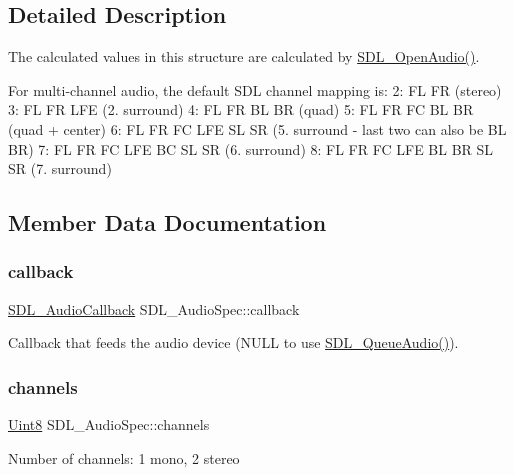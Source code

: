 \subsection{Detailed Description}
The calculated values in this structure are calculated by \mbox{\hyperlink{_s_d_l__audio_8h_a2edf30e7747584e28041b4986f89f440}{S\+D\+L\+\_\+\+Open\+Audio()}}.

For multi-\/channel audio, the default S\+DL channel mapping is\+: 2\+: FL FR (stereo) 3\+: FL FR L\+FE (2. surround) 4\+: FL FR BL BR (quad) 5\+: FL FR FC BL BR (quad + center) 6\+: FL FR FC L\+FE SL SR (5. surround -\/ last two can also be BL BR) 7\+: FL FR FC L\+FE BC SL SR (6. surround) 8\+: FL FR FC L\+FE BL BR SL SR (7. surround) 

\subsection{Member Data Documentation}
\mbox{\label{struct_s_d_l___audio_spec_a1f8d05139f1679dcf359f49251233eac}} 
\subsubsection{\texorpdfstring{callback}{callback}}
{\footnotesize\ttfamily \mbox{\hyperlink{_s_d_l__audio_8h_a379fcc25845e46bfa80cb3619fc2821c}{S\+D\+L\+\_\+\+Audio\+Callback}} S\+D\+L\+\_\+\+Audio\+Spec\+::callback}

Callback that feeds the audio device (N\+U\+LL to use \mbox{\hyperlink{_s_d_l__audio_8h_a19ef6fa2396f581aaf4d9a9512972268}{S\+D\+L\+\_\+\+Queue\+Audio()}}). \mbox{\label{struct_s_d_l___audio_spec_a31fe8b3710cf23bbef24be8a1749fe46}} 
\subsubsection{\texorpdfstring{channels}{channels}}
{\footnotesize\ttfamily \mbox{\hyperlink{_s_d_l__stdinc_8h_a2944638813a090aa23e62f4da842c3e2}{Uint8}} S\+D\+L\+\_\+\+Audio\+Spec\+::channels}

Number of channels\+: 1 mono, 2 stereo \mbox{\label{struct_s_d_l___audio_spec_ae37c634cac5807762f184c8d5d49fc2d}} 
